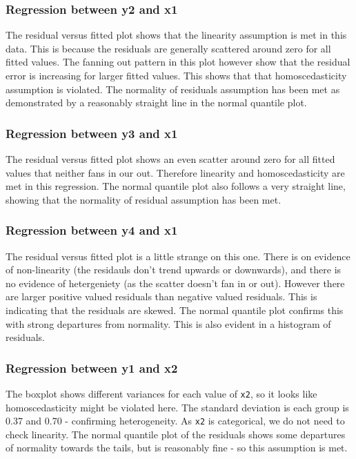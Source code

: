 \documentclass[
  letterpaper,
  DIV=11,
  numbers=noendperiod]{scrreprt}
\begin{document}
\subsubsection{Regression between y2 and
x1}\label{regression-between-y2-and-x1}

The residual versus fitted plot shows that the linearity assumption is
met in this data. This is because the residuals are generally scattered
around zero for all fitted values. The fanning out pattern in this plot
however show that the residual error is increasing for larger fitted
values. This shows that that homoscedasticity assumption is violated.
The normality of residuals assumption has been met as demonstrated by a
reasonably straight line in the normal quantile plot.

\subsubsection{Regression between y3 and
x1}\label{regression-between-y3-and-x1}

The residual versus fitted plot shows an even scatter around zero for
all fitted values that neither fans in our out. Therefore linearity and
homoscedasticity are met in this regression. The normal quantile plot
also follows a very straight line, showing that the normality of
residual assumption has been met.

\subsubsection{Regression between y4 and
x1}\label{regression-between-y4-and-x1}

The residual versus fitted plot is a little strange on this one. There
is on evidence of non-linearity (the residauls don't trend upwards or
downwards), and there is no evidence of hetergeniety (as the scatter
doesn't fan in or out). However there are larger positive valued
residuals than negative valued residuals. This is indicating that the
residuals are skewed. The normal quantile plot confirms this with strong
departures from normality. This is also evident in a histogram of
residuals.

\subsubsection{Regression between y1 and
x2}\label{regression-between-y1-and-x2}

The boxplot shows different variances for each value of \texttt{x2}, so
it looks like homoscedasticity might be violated here. The standard
deviation is each group is 0.37 and 0.70 - confirming heterogeneity. As
\texttt{x2} is categorical, we do not need to check linearity. The
normal quantile plot of the residuals shows some departures of normality
towards the tails, but is reasonably fine - so this assumption is met.
\end{document}
